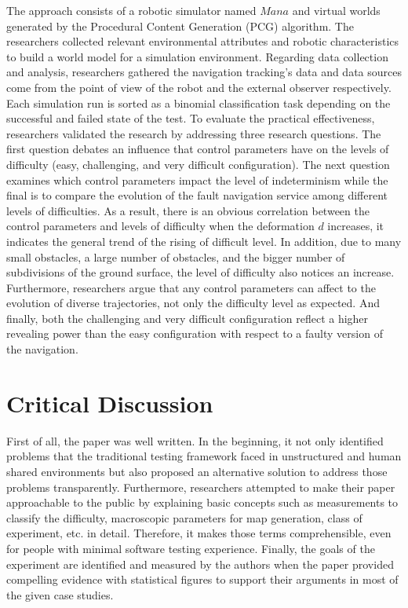 \documentclass[10pt,a4paper]{report}
\begin{document}
The approach consists of a robotic simulator named $Mana$ and virtual worlds generated by the Procedural Content Generation (PCG) algorithm. 
%
The researchers collected relevant environmental attributes and robotic characteristics to build a world model for a simulation environment.
%
Regarding data collection and analysis, researchers gathered the navigation tracking's data and data sources come from the point of view of the robot and the external observer respectively.
%
Each simulation run is sorted as a binomial classification task depending on the successful and failed state of the test.
%
To evaluate the practical effectiveness, researchers validated the research by addressing three research questions.
%
The first question debates an influence that control parameters have on the levels of difficulty (easy, challenging, and very difficult configuration).
%
The next question examines which control parameters impact the level of indeterminism while the final is to compare the evolution of the fault navigation service among different levels of difficulties.
%
As a result, there is an obvious correlation between the control parameters and levels of difficulty when the deformation $d$ increases, it indicates the general trend of the rising of difficult level.
%
In addition, due to many small obstacles, a large number of obstacles, and the bigger number of subdivisions of the ground surface, the level of difficulty also notices an increase.
%
Furthermore, researchers argue that any control parameters can affect to the evolution of diverse trajectories, not only the difficulty level as expected.
%
And finally, both the challenging and very difficult configuration reflect a higher revealing power than the easy configuration with respect to a faulty version of the navigation.



\section{Critical Discussion}
First of all, the paper was well written. In the beginning, it not only identified problems that the traditional testing framework faced in unstructured and human shared environments but also proposed an alternative solution to address those problems transparently.
%
Furthermore, researchers attempted to make their paper approachable to the public by explaining basic concepts such as measurements to classify the difficulty, macroscopic parameters for map generation, class of experiment, etc. in detail. Therefore, it makes those terms comprehensible, even for people with minimal software testing experience.  
%
Finally, the goals of the experiment are identified and measured by the authors when the paper provided compelling evidence with statistical figures to support their arguments in most of the given case studies.
%
\end{document}
